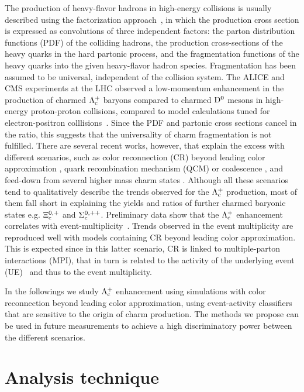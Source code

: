 \documentclass[aps,amsmath,amssymb,a4paper,11pt,superscriptaddress]{revtex4-2}
\newcommand*{\Lc}{\ensuremath{\Lambda_{\rm c}^+}\xspace}
\newcommand*{\Xic}{\ensuremath{\Xi_{\rm c}^{0,+}}\xspace}
\newcommand*{\Sigc}{\ensuremath{\Sigma_{\rm c}^{0,++}}\xspace}
\newcommand*{\Dz}{\ensuremath{\rm D^0}\xspace}
\begin{document}
The production of heavy-flavor hadrons in high-energy collisions is usually described using the factorization approach~\cite{Collins:1989gx}, in which the production cross section is expressed as convolutions of three independent factors: the parton distribution functions (PDF) of the colliding hadrons, the production cross-sections of the heavy quarks in the hard partonic process, and the fragmentation functions of the heavy quarks into the given heavy-flavor hadron species. Fragmentation has been assumed to be universal, independent of the collision system. 
The ALICE and CMS experiments at the LHC observed a low-momentum enhancement in the production of charmed \Lc baryons compared to charmed \Dz mesons in high-energy proton-proton collisions, compared to model calculations tuned for electron-positron colllisions~\cite{ALICE:2017thy,CMS:2019uws,ALICE:2020wfu}. Since the PDF and partonic cross sections cancel in the ratio, this suggests that the universality of charm fragmentation is not fulfilled. 
There are several recent works, however, that explain the excess with different scenarios, such as color reconnection (CR) beyond leading color approximation \cite{Christiansen:2015yqa}, quark recombination mechanism (QCM) \cite{Song:2018tpv} or coalescence \cite{Plumari:2017ntm}, and feed-down from several higher mass charm states \cite{He:2019tik}.
Although all these scenarios tend to qualitatively describe the trends observed for the \Lc production, most of them fall short in explaining the yields and ratios of further charmed baryonic states e.g. \Xic and \Sigc \cite{ALICE:2021bli}.
Preliminary data show that the \Lc enhancement correlates with event-multiplicity~\cite{Hills:2021eto}. Trends observed in the event multiplicity are reproduced well with models containing CR beyond leading color approximation. This is expected since in this latter scenario, CR is linked to multiple-parton interactions (MPI), that in turn is related to the activity of the underlying event (UE)~\cite{Martin:2016igp} and thus to the event multiplicity.

In the followings we study \Lc enhancement using simulations with color reconnection beyond leading color approximation, using event-activity classifiers that are sensitive to the origin of charm production. The methods we propose can be used in future measurements to achieve a high discriminatory power between the different scenarios. 

\section{Analysis technique}
\label{sec:simualtion}
\end{document}
